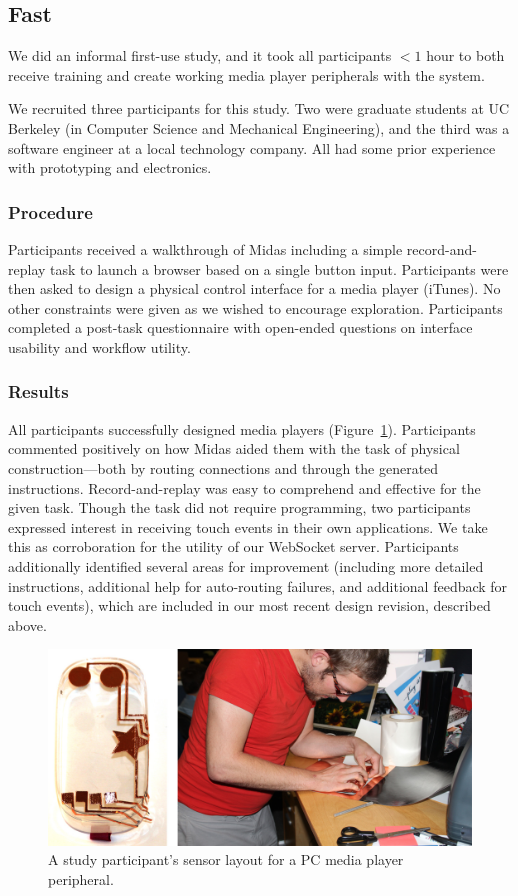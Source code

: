     \subsection{Fast}
    
    We did an informal first-use study, and it took all participants $<1$ hour to both receive training and create working media player peripherals with the system.
    
    We recruited three participants for this study. Two were graduate students at UC Berkeley (in Computer Science and Mechanical Engineering), and the third was a software engineer at a local technology company. All had some prior experience with prototyping and electronics.

        \subsubsection{Procedure}
Participants received a walkthrough of Midas including a simple record-and-replay task to launch a browser based on a single button input. Participants were then asked to design a physical control interface for a media player (iTunes). No other constraints were given as we wished to encourage exploration. Participants completed a post-task questionnaire with open-ended questions on interface usability and workflow utility.

    \subsubsection{Results}
All participants successfully designed media players (Figure~\ref{fig:midas-study1}). Participants commented positively on how Midas aided them with the task of physical construction---both by routing connections and through the generated instructions. Record-and-replay was easy to comprehend and effective for the given task. Though the task did not require programming, two participants expressed interest in receiving touch events in their own applications. We take this as corroboration for the utility of our WebSocket server. Participants additionally identified several areas for improvement (including more detailed instructions, additional help for auto-routing failures, and additional feedback for touch events), which are included in our most recent design revision, described above.

\begin{figure}[t]
\centering
\includegraphics[width=\textwidth]{figures/midas/study1.jpg}
\caption{A study participant's sensor layout for a PC media player peripheral.} 
\label{fig:midas-study1}
\end{figure}

